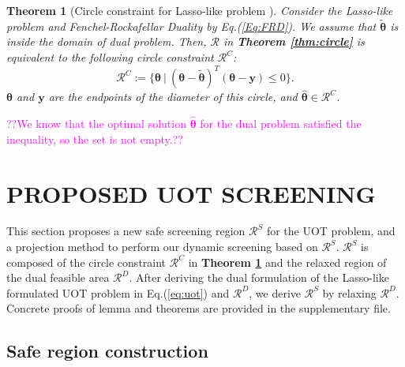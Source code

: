 \documentclass[twoside]{article}
\theoremstyle{plain}
\newtheorem{thm}{Theorem}
\renewcommand{\vec}[1]{\bm{#1}}
\newcommand{\note}[1]{\textcolor{magenta}{#1}}
\begin{document}
\begin{thm}[Circle constraint for Lasso-like problem {\citep[Theorem 8]{Yamada_NIPS_2021}}]
\label{Thm:CC}
Consider the Lasso-like problem and Fenchel-Rockafellar Duality by Eq.(\ref{Eq:FRD}). We assume that $\tilde{\vec{\theta}}$ is inside the domain of dual problem. Then, $\mathcal{R}$ in {\bf Theorem \ref{thm:circle}} is equivalent to the following circle constraint $\mathcal{R}^{C}$:
\begin{equation}
\mathcal{R}^{C} :=\{\vec\theta\ |\ (\vec{\theta}-\tilde{\vec{\theta}})^T(\vec{\theta}-\vec{y})\leq 0\}.
\label{eq:uotcircle}
\end{equation}
$\vec\theta$ and $\vec y$ are the endpoints of the diameter of this circle, and $\hat{ \vec\theta} \in \mathcal{R}^{C}$.
\end{thm}

\note{??We know that the optimal solution $\hat{\vec{\theta}}$ for the dual problem satisfied the inequality, so the set is not empty.??}


\section{PROPOSED UOT SCREENING}
\label{sec:pro}

This section proposes a new safe screening region $\mathcal{R}^S$ for the UOT problem, and a projection method to perform our dynamic screening based on $\mathcal{R}^S$. $\mathcal{R}^S$ is composed of the circle constraint $\mathcal{R}^C$ in {\bf Theorem \ref{Thm:CC}} and the relaxed region of the dual feasible area $\mathcal{R}^D$. After deriving the dual formulation of the Lasso-like formulated UOT problem in Eq.(\ref{eq:uot}) and $\mathcal{R}^D$, we derive $\mathcal{R}^S$ by relaxing $\mathcal{R}^D$. 
%
Concrete proofs of lemma and theorems are provided in the supplementary file.
\subsection{Safe region construction}
\end{document}
